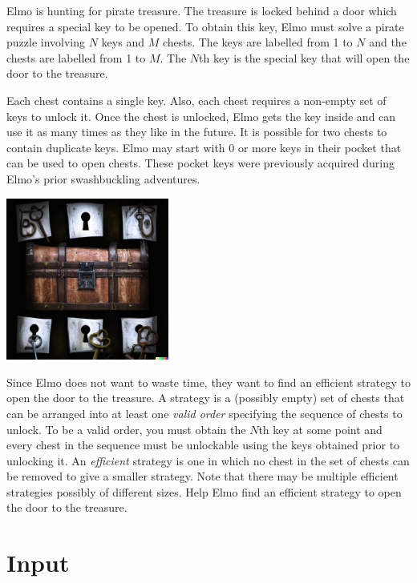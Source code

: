 
Elmo is hunting for pirate treasure. The treasure is locked behind a door which requires a special key to be opened. To obtain this key, Elmo must solve a pirate puzzle involving $N$ keys and $M$ chests. The keys are labelled from 1 to $N$ and the chests are labelled from 1 to $M$. The $N$th key is the special key that will open the door to the treasure.

Each chest contains a single key. Also, each chest requires a non-empty set of keys to unlock it. Once the chest is unlocked, Elmo gets the key inside and can use it as many times as they like in the future. It is possible for two chests to contain duplicate keys. Elmo may start with 0 or more keys in their pocket that can be used to open chests. These pocket keys were previously acquired during Elmo's prior swashbuckling adventures.

\begin{center}
    \includegraphics[width=0.4\textwidth]{fig}
\end{center}


Since Elmo does not want to waste time, they want to find an efficient strategy to open the door to the treasure. A strategy is a (possibly empty) set of chests that can be arranged into at least one \textit{valid order} specifying the sequence of chests to unlock. To be a valid order, you must obtain the $N$th key at some point and every chest in the sequence must be unlockable using the keys obtained prior to unlocking it. An \textit{efficient} strategy is one in which no chest in the set of chests can be removed to give a smaller strategy. Note that there may be multiple efficient strategies possibly of different sizes. Help Elmo find an efficient strategy to open the door to the treasure.


\section*{Input}

